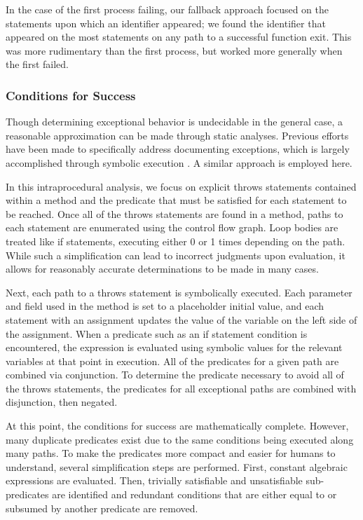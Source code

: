\documentclass[preprint]{sigplanconf}
\begin{document}
In the case of the first process failing, our fallback approach focused on the statements upon which an identifier appeared; we found the identifier that appeared on the most statements on any path to a successful function exit. This was more rudimentary than the first process, but worked more generally when the first failed.

\subsubsection{Conditions for Success}
Though determining exceptional behavior is undecidable in the general case, a reasonable approximation can be made through static analyses. Previous efforts have been made to specifically address documenting exceptions, which is largely accomplished through symbolic execution \cite{buse08}. A similar approach is employed here.

In this intraprocedural analysis, we focus on explicit throws statements contained within a method and the predicate that must be satisfied for each statement to be reached. Once all of the throws statements are found in a method, paths to each statement are enumerated using the control flow graph. Loop bodies are treated like if statements, executing either 0 or 1 times depending on the path. While such a simplification can lead to incorrect judgments upon evaluation, it allows for reasonably accurate determinations to be made in many cases.

Next, each path to a throws statement is symbolically executed. Each parameter and field used in the method is set to a placeholder initial value, and each statement with an assignment updates the value of the variable on the left side of the assignment. When a predicate such as an if statement condition is encountered, the expression is evaluated using symbolic values for the relevant variables at that point in execution. All of the predicates for a given path are combined via conjunction. To determine the predicate necessary to avoid all of the throws statements, the predicates for all exceptional paths are combined with disjunction, then negated.

At this point, the conditions for success are mathematically complete. However, many duplicate predicates exist due to the same conditions being executed along many paths. To make the predicates more compact and easier for humans to understand, several simplification steps are performed. First, constant algebraic expressions are evaluated. Then, trivially satisfiable and unsatisfiable sub-predicates are identified and redundant conditions that are either equal to or subsumed by another predicate are removed.
\end{document}
